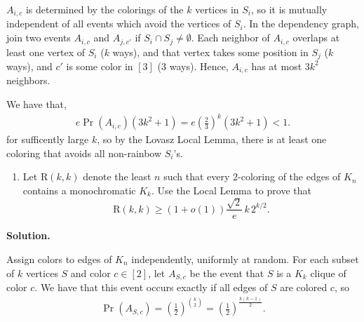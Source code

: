 \documentclass[11pt,letterpaper]{article}
\theoremstyle{definition}
\newcommand{\solution}{\medskip\noindent\textbf{Solution.}\par\medskip}
\begin{document}
$A_{i,c}$ is determined by the colorings of the $k$ vertices in $S_i$, so it is mutually independent of all events which avoid the vertices of $S_i$.
In the dependency graph, join two events $A_{i,c}$ and $A_{j,c'}$ if $S_i\cap S_j \neq \emptyset$.
Each neighbor of $A_{i,c}$ overlaps at least one vertex of $S_i$ ($k$ ways), and that vertex takes some position in $S_j$ ($k$ ways), and $c'$ is some color in $[3]$ (3 ways).
Hence, $A_{i,c}$ has at most $3k^2$ neighbors.

We have that, 
\begin{align*}
    e \Pr(A_{i,c}) (3k^2+1) = e \left(\frac{2}{3}\right)^k (3k^2+1)<1.
\end{align*}
for sufficently large $k$, so by the Lovasz Local Lemma, there is at least one coloring that avoids all non-rainbow $S_i$'s.

\begin{enumerate}[resume=q]
\item Let $\mathrm{R}(k,k)$ denote the least $n$ such that every $2$-coloring of the edges of $K_n$ contains a monochromatic $K_k$. Use the Local Lemma to prove that
\[
\mathrm{R}(k,k) \geq (1+o(1))\frac{\sqrt{2}}{e}\,k\,2^{k/2}.
\]
\end{enumerate}

\solution

Assign colors to edges of $K_n$ independently, uniformly at random. 
For each subset of $k$ vertices $S$ and color $c\in[2]$, let $A_{S,c}$ be the event that $S$ is a $K_k$ clique of color $c$.
We have that this event occurs exactly if all edges of $S$ are colored $c$, so
\begin{align*}
    \Pr(A_{S,c}) = \left(\frac{1}{2}\right)^{\binom{k}{2}} = \left(\frac{1}{2}\right)^{\frac{k(k-1)}{2}} .
\end{align*}
\end{document}
